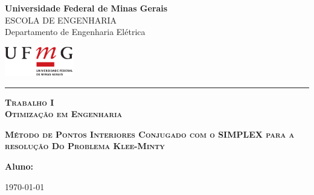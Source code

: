 \thispagestyle{empty}

\noindent
\begin{minipage}{0.8\linewidth}
  {\Large\bf Universidade Federal de Minas Gerais}\\
  {\small ESCOLA DE ENGENHARIA}\\
  {\sc Departamento de Engenharia Elétrica}
\end{minipage} 
\hfill 
\begin{minipage}{3cm}
  \includegraphics[width=3cm]{ufmg_ext.pdf}
\end{minipage}

\vspace{1mm}

\noindent
\hrule

\vspace{2.0cm}

\vfill

\begin{center}
  \Large \textsc{\textbf{Trabalho I}}\\ 
  \Large \textsc{\textbf{Otimização em Engenharia}}
\end{center}

\vfill

\begin{center}
  \Large\textsc{\textbf{Método de Pontos Interiores Conjugado com o SIMPLEX para a resolução Do Problema Klee-Minty}}
\end{center}

\vfill

\begin{flushright}
\begin{minipage}{12.0cm}
{\bf Aluno:} \nomeAluno \\
\end{minipage}
\end{flushright}

\vfill

\begin{center}
  \today
\end{center}

\vfill

\newpage